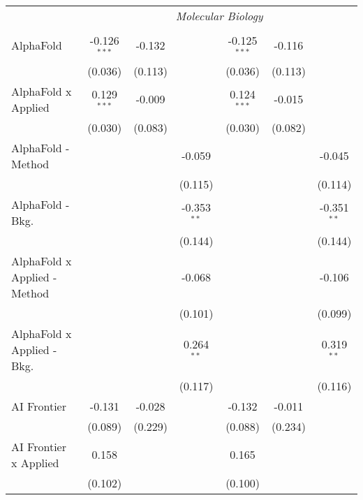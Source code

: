 \begin{tabular}{lcccccc}
 & \multicolumn{6}{c}{\textit{Molecular Biology}} \\ \\
   AlphaFold                    & -0.126$^{***}$ & -0.132  &               & -0.125$^{***}$ & -0.116  &   \\   
                                & (0.036)        & (0.113) &               & (0.036)        & (0.113) &   \\   
   AlphaFold x Applied          & 0.129$^{***}$  & -0.009  &               & 0.124$^{***}$  & -0.015  &   \\   
                                & (0.030)        & (0.083) &               & (0.030)        & (0.082) &   \\   
   AlphaFold - Method           &                &         & -0.059        &                &         & -0.045\\   
                                &                &         & (0.115)       &                &         & (0.114)\\   
   AlphaFold - Bkg.             &                &         & -0.353$^{**}$ &                &         & -0.351$^{**}$\\   
                                &                &         & (0.144)       &                &         & (0.144)\\   
   AlphaFold x Applied - Method &                &         & -0.068        &                &         & -0.106\\   
                                &                &         & (0.101)       &                &         & (0.099)\\   
   AlphaFold x Applied - Bkg.   &                &         & 0.264$^{**}$  &                &         & 0.319$^{**}$\\   
                                &                &         & (0.117)       &                &         & (0.116)\\   
   AI Frontier                  & -0.131         & -0.028  &               & -0.132         & -0.011  &   \\   
                                & (0.089)        & (0.229) &               & (0.088)        & (0.234) &   \\   
   AI Frontier x Applied        & 0.158          &         &               & 0.165          &         &   \\   
                                & (0.102)        &         &               & (0.100)        &         &   \\   

\end{tabular}
